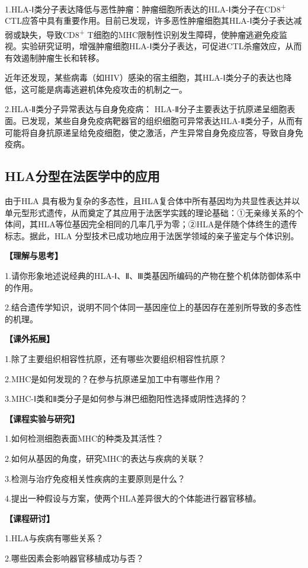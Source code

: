 1.HLA-Ⅰ类分子表达降低与恶性肿瘤：肿瘤细胞所表达的HLA-Ⅰ类分子在CD8\textsuperscript{+}
CTL应答中具有重要作用。目前已发现，许多恶性肿瘤细胞其HLA-Ⅰ类分子表达减弱或缺失，导致CD8\textsuperscript{+}
T细胞的MHC限制性识别发生障碍，使肿瘤逃避免疫监视。实验研究证明，增强肿瘤细胞HLA-Ⅰ类分子表达，可促进CTL杀瘤效应，从而有效遏制肿瘤生长和转移。

近年还发现，某些病毒（如HIV）感染的宿主细胞，其HLA-Ⅰ类分子的表达也降低，这可能是病毒逃避机体免疫攻击的机制之一。

2.HLA-Ⅱ类分子异常表达与自身免疫病：
HLA-Ⅱ分子主要表达于抗原递呈细胞表面。已发现，某些自身免疫病靶器官的组织细胞可异常表达HLA-Ⅱ类分子，从而有可能将自身抗原递呈给免疫细胞，使之激活，产生异常自身免疫应答，导致自身免疫病。


\subsection{HLA分型在法医学中的应用}

由于HLA
具有极为复杂的多态性，且HLA复合体中所有基因均为共显性表达并以单元型形式遗传，从而奠定了其应用于法医学实践的理论基础：①无亲缘关系的个体间，其HLA等位基因完全相同的几率几乎为零；②HLA是伴随个体终生的遗传标志。据此，HLA
分型技术已成功地应用于法医学领域的亲子鉴定与个体识别。

\noindent\textbf{【理解与思考】}

1.请你形象地述说经典的HLA-Ⅰ、Ⅱ、Ⅲ类基因所编码的产物在整个机体防御体系中的作用。

2.结合遗传学知识，说明不同个体同一基因座位上的基因存在差别所导致的多态性的机理。

\noindent\textbf{【课外拓展】}

1.除了主要组织相容性抗原，还有哪些次要组织相容性抗原？

2.MHC是如何发现的？在参与抗原递呈加工中有哪些作用？

3.MHC-Ⅰ类和Ⅱ类分子是如何参与淋巴细胞阳性选择或阴性选择的？

\noindent\textbf{【课程实验与研究】}

1.如何检测细胞表面MHC的种类及其活性？

2.如何从基因的角度，研究MHC的表达与疾病的关联？

3.检测与治疗免疫相关性疾病的主要原则是什么？

4.提出一种假设与方案，使两个HLA差异很大的个体能进行器官移植。

\noindent\textbf{【课程研讨】}

1.HLA与疾病有哪些关系？

2.哪些因素会影响器官移植成功与否？

